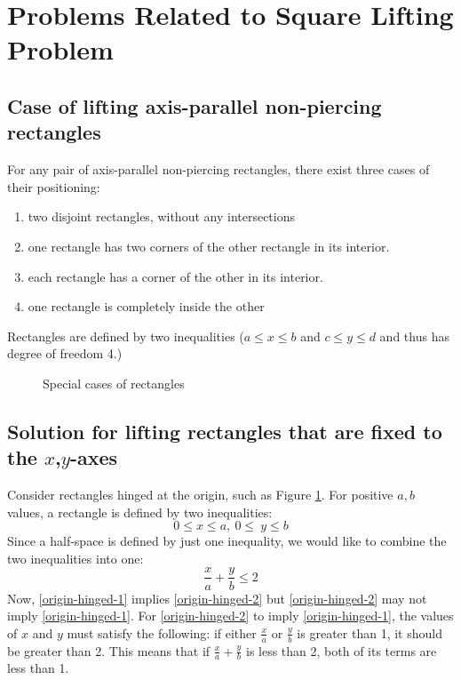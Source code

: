 \documentclass{NSF}
\begin{document}
\section{Problems Related to Square Lifting Problem}

\subsection{Case of lifting axis-parallel non-piercing rectangles}
For any pair of axis-parallel non-piercing rectangles, there exist three cases of their positioning:
\begin{enumerate}
\item two disjoint rectangles, without any intersections
\item one rectangle has two corners of the other rectangle in its interior.
\item each rectangle has a corner of the other in its interior.
\item one rectangle is completely inside the other
\end{enumerate}
Rectangles are defined by two inequalities ($a\leq x \leq b$ and $c \leq y \leq d$ and thus has degree of freedom 4.)

\begin{figure}[ht]
\hspace{.3in}
\caption{Special cases of rectangles}
\label{fig:origin-building-example}
\end{figure}

\subsection{Solution for lifting rectangles that are fixed to the \texorpdfstring{$x$,$y$}{x,y}-axes}

Consider rectangles hinged at the origin, such as Figure \ref{fig:origin-building-example}. For positive $a,b$ values, a rectangle is defined by two inequalities: 
\begin{equation}\label{origin-hinged-1}
0 \leq x \leq a,\  0\leq \  y \leq b
\end{equation}
Since a half-space is defined by just one inequality, we would like to combine the two inequalities into one: 
\begin{equation}\label{origin-hinged-2}
\frac{x}{a} + \frac{y}{b} \leq 2
\end{equation}
Now, \eqref{origin-hinged-1} implies \eqref{origin-hinged-2} but \eqref{origin-hinged-2}  may not imply \eqref{origin-hinged-1}. For \eqref{origin-hinged-2} to imply \eqref{origin-hinged-1}, the values of $x$ and $y$ must satisfy the following: if either $\frac{x}{a}$ or $\frac{y}{b}$ is greater than 1, it should be greater than 2. This means that if $\frac{x}{a}+\frac{y}{b}$  is less than 2, both of its terms are less than 1.
\end{document}
